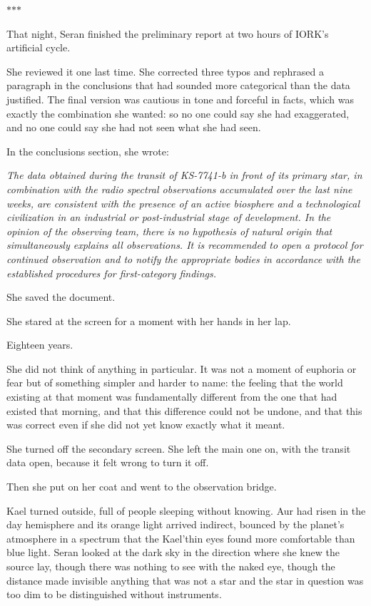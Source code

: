 \documentclass[11pt,a5paper,twoside]{book}
\begin{document}
\vspace{1.5em}
\begin{center}$\ast$\quad$\ast$\quad$\ast$\end{center}
\vspace{1.5em}

That night, Seran finished the preliminary report at two hours of IORK’s artificial cycle.

She reviewed it one last time. She corrected three typos and rephrased a paragraph in the conclusions that had sounded more categorical than the data justified. The final version was cautious in tone and forceful in facts, which was exactly the combination she wanted: so no one could say she had exaggerated, and no one could say she had not seen what she had seen.

In the conclusions section, she wrote:

\textit{The data obtained during the transit of KS-7741-b in front of its primary star, in combination with the radio spectral observations accumulated over the last nine weeks, are consistent with the presence of an active biosphere and a technological civilization in an industrial or post-industrial stage of development. In the opinion of the observing team, there is no hypothesis of natural origin that simultaneously explains all observations. It is recommended to open a protocol for continued observation and to notify the appropriate bodies in accordance with the established procedures for first-category findings.}

She saved the document.

She stared at the screen for a moment with her hands in her lap.

Eighteen years.

She did not think of anything in particular. It was not a moment of euphoria or fear but of something simpler and harder to name: the feeling that the world existing at that moment was fundamentally different from the one that had existed that morning, and that this difference could not be undone, and that this was correct even if she did not yet know exactly what it meant.

She turned off the secondary screen. She left the main one on, with the transit data open, because it felt wrong to turn it off.

Then she put on her coat and went to the observation bridge.

Kael turned outside, full of people sleeping without knowing. Aur had risen in the day hemisphere and its orange light arrived indirect, bounced by the planet’s atmosphere in a spectrum that the Kael'thin eyes found more comfortable than blue light. Seran looked at the dark sky in the direction where she knew the source lay, though there was nothing to see with the naked eye, though the distance made invisible anything that was not a star and the star in question was too dim to be distinguished without instruments.
\end{document}
